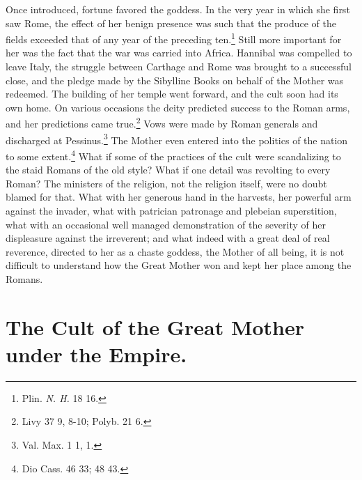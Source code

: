 \documentclass[a4paper, 11pt, oneside, polutonikogreek, french]{article}
\begin{document}
Once introduced, fortune favored the goddess. In the very year in which she first saw Rome, the effect of her benign presence was such that the produce of the fields exceeded that of any year of the preceding ten.\footnote{Plin. \emph{N. H.} 18 16.} Still more important for her was the fact that the war was carried into Africa. Hannibal was compelled to leave Italy, the struggle between Carthage and Rome was brought to a successful close, and the pledge made by the Sibylline Books on behalf of the Mother was redeemed. The building of her temple went forward, and the cult soon had its own home. On various occasions the deity predicted success to the Roman arms, and her predictions came true.\footnote{Livy 37 9, 8-10; Polyb. 21 6.} Vows were made by Roman generals and discharged at Pessinus.\footnote{Val. Max. 1 1, 1.} The Mother even entered into the politics of the nation to some extent.\footnote{Dio Cass. 46 33; 48 43.} What if some of the practices of the cult were scandalizing to the staid Romans of the old style? What if one detail was revolting to every Roman? The ministers of the religion, not the religion itself, were no doubt blamed for that. What with her generous hand in the harvests, her powerful arm against the invader, what with patrician patronage and plebeian superstition, what with an occasional well managed demonstration of the severity of her displeasure against the irreverent; and what indeed with a great deal of real reverence, directed to her as a chaste goddess, the Mother of all being, it is not difficult to understand how the Great Mother won and kept her place among the Romans.
\clearpage
\section{The Cult of the Great Mother under the Empire.}
\end{document}
